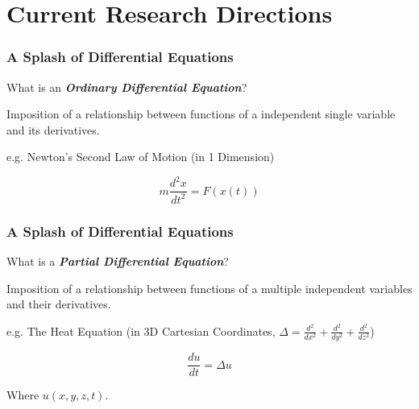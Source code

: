 \section{Current Research Directions}

\begin{frame}
    \frametitle{A Splash of Differential Equations}

    What is an \textit{\textbf{Ordinary Differential Equation}}?

    \vline

    Imposition of a relationship between functions of a independent single variable and its derivatives.

    \vline

    e.g. Newton's Second Law of Motion (in 1 Dimension)

    \begin{equation}
        m \frac{d^2x}{dt^2} = F(x(t))
    \end{equation}

\end{frame}



\begin{frame}
    \frametitle{A Splash of Differential Equations}

    What is a \textit{\textbf{Partial Differential Equation}}?

    \vline

    Imposition of a relationship between functions of a multiple independent variables and their derivatives.

    \vline

    e.g. The Heat Equation (in 3D Cartesian Coordinates, $\Delta = \frac{d^2}{dx^2} + \frac{d^2}{dy^2} + \frac{d^2}{dz^2}$)

    \begin{equation}
        \frac{du}{dt} = \Delta u
    \end{equation}

    \vline

    Where $u(x, y, z, t)$.

\end{frame}

